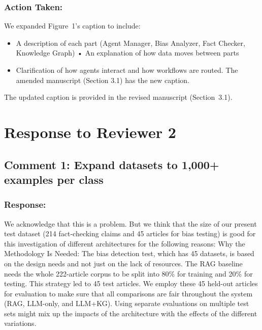 \documentclass[11pt]{article}
\begin{document}
\subsubsection*{Action Taken:}
We expanded Figure~1's caption to include:
\begin{itemize}
    \item A description of each part (Agent Manager, Bias Analyzer, Fact Checker, Knowledge Graph) • An explanation of how data moves between parts

    \item Clarification of how agents interact and how workflows are routed. The amended manuscript (Section 3.1) has the new caption.

\end{itemize}

The updated caption is provided in the revised manuscript (Section~3.1).

\section{Response to Reviewer 2}

\subsection{Comment 1: Expand datasets to 1,000+ examples per class}

\subsubsection*{Response:}
 We acknowledge that this is a problem. But we think that the size of our present test dataset (214 fact-checking claims and 45 articles for bias testing) is good for this investigation of different architectures for the following reasons:
Why the Methodology Is Needed: The bias detection test, which has 45 datasets, is based on the design needs and not just on the lack of resources. The RAG baseline needs the whole 222-article corpus to be split into 80\% for training and 20\% for testing. This strategy led to 45 test articles. We employ these 45 held-out articles for evaluation to make sure that all comparisons are fair throughout the system (RAG, LLM-only, and LLM+KG). Using separate evaluations on multiple test sets might mix up the impacts of the architecture with the effects of the different variations.
\end{document}
